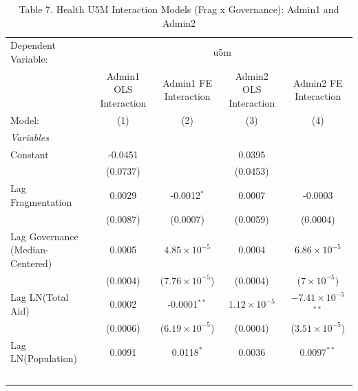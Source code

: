 \begin{table}[H]
   \caption{Table 7. Health U5M Interaction Models (Frag x Governance): Admin1 and Admin2}
   \centering
   \begin{tabular}{lcccc}
      \tabularnewline \midrule \midrule
      Dependent Variable: & \multicolumn{4}{c}{u5m}\\
                                                           & Admin1 OLS Interaction & Admin1 FE Interaction   & Admin2 OLS Interaction & Admin2 FE Interaction \\   
      Model:                                               & (1)                    & (2)                     & (3)                    & (4)\\  
      \midrule
      \emph{Variables}\\
      Constant                                             & -0.0451                &                         & 0.0395                 &   \\   
                                                           & (0.0737)               &                         & (0.0453)               &   \\   
      Lag Fragmentation                                    & 0.0029                 & -0.0012$^{*}$           & 0.0007                 & -0.0003\\   
                                                           & (0.0087)               & (0.0007)                & (0.0059)               & (0.0004)\\   
      Lag Governance (Median-Centered)                     & 0.0005                 & $4.85\times 10^{-5}$    & 0.0004                 & $6.86\times 10^{-5}$\\    
                                                           & (0.0004)               & ($7.76\times 10^{-5}$)  & (0.0004)               & ($7\times 10^{-5}$)\\    
      Lag LN(Total Aid)                                    & 0.0002                 & -0.0001$^{**}$          & $1.12\times 10^{-5}$   & $-7.41\times 10^{-5}$$^{**}$\\    
                                                           & (0.0006)               & ($6.19\times 10^{-5}$)  & (0.0004)               & ($3.51\times 10^{-5}$)\\    
      Lag LN(Population)                                   & 0.0091                 & 0.0118$^{*}$            & 0.0036                 & 0.0097$^{**}$\\   
$$
\end{tabular}
\end{table}
